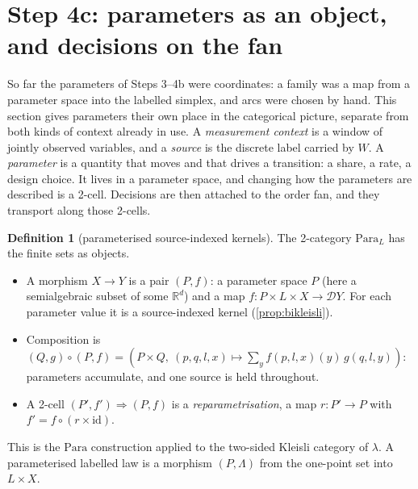\documentclass[11pt]{article}
\theoremstyle{definition}\newtheorem{definition}[theorem]{Definition}\newtheorem{remark}[theorem]{Remark}\newtheorem{example}[theorem]{Example}
\newcommand{\R}{\mathbb R}\newcommand{\D}{\mathcal D}
\begin{document}
\section{Step 4c: parameters as an object, and decisions on the fan}\label{sec:para}
So far the parameters of Steps 3--4b were coordinates: a family was a map from a parameter space into the labelled simplex, and arcs were
chosen by hand. This section gives parameters their own place in the categorical picture, separate from both kinds of context already
in use. A \emph{measurement context} is a window of jointly observed variables, and a \emph{source} is the discrete label carried by $W$.
A \emph{parameter} is a quantity that moves and that drives a transition: a share, a rate, a design choice. It lives in a parameter space,
and changing how the parameters are described is a 2-cell. Decisions are then attached to the order fan, and they transport along those
2-cells.

\begin{definition}[parameterised source-indexed kernels]\label{def:para}
The 2-category $\mathrm{Para}_L$ has the finite sets as objects.
\begin{itemize}
\item A morphism $X\to Y$ is a pair $(P,f)$: a parameter space $P$ (here a semialgebraic subset of some $\R^d$) and a map
  $f:P\times L\times X\to\D Y$. For each parameter value it is a source-indexed kernel (\cref{prop:bikleisli}).
\item Composition is $(Q,g)\circ(P,f)=(P\times Q,\ (p,q,l,x)\mapsto\sum_yf(p,l,x)(y)\,g(q,l,y))$: parameters accumulate, and one source is
  held throughout.
\item A 2-cell $(P',f')\Rightarrow(P,f)$ is a \emph{reparametrisation}, a map $r:P'\to P$ with $f'=f\circ(r\times\mathrm{id})$.
\end{itemize}
This is the $\mathrm{Para}$ construction \cite{FongSpivakTuyeras2019,CruttwellEtAl2022} applied to the two-sided Kleisli category of $\lambda$.
A parameterised labelled law is a morphism $(P,\Lambda)$ from the one-point set into $L\times X$.
\end{definition}
\end{document}
